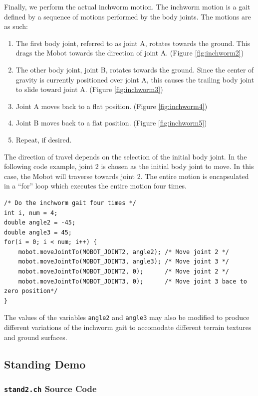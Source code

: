 \documentclass{article}
\begin{document}
Finally, we perform the actual inchworm motion. The inchworm motion is a gait defined
by a sequence of motions performed by the body joints. The motions are as such:
\begin{enumerate}
\item The first body joint, referred to as joint A, rotates towards the ground.
This drags the Mobot towards the direction of joint A. (Figure \ref{fig:inchworm2})
\item The other body joint, joint B, rotates towards the ground. Since the center
of gravity is currently positioned over joint A, this causes the trailing body 
joint to slide toward joint A. (Figure \ref{fig:inchworm3})
\item Joint A moves back to a flat position. (Figure \ref{fig:inchworm4})
\item Joint B moves back to a flat position. (Figure \ref{fig:inchworm5})
\item Repeat, if desired.
\end{enumerate}
The direction of travel depends on the selection of the initial body joint. In
the following code example, joint 2 is chosen as the initial body joint to move.
In this case, the Mobot will traverse towards joint 2. The entire motion is
encapsulated in a ``for'' loop which executes the entire motion four times.
\begin{verbatim}
/* Do the inchworm gait four times */
int i, num = 4;
double angle2 = -45;
double angle3 = 45;
for(i = 0; i < num; i++) {
    mobot.moveJointTo(MOBOT_JOINT2, angle2); /* Move joint 2 */
    mobot.moveJointTo(MOBOT_JOINT3, angle3); /* Move joint 3 */
    mobot.moveJointTo(MOBOT_JOINT2, 0);      /* Move joint 2 */
    mobot.moveJointTo(MOBOT_JOINT3, 0);      /* Move joint 3 bace to zero position*/
}
\end{verbatim}
The values of the variables \texttt{angle2} and \texttt{angle3} may also be modified
to produce different variations of the inchworm gait to accomodate different terrain
textures and ground surfaces.

\subsection{Standing Demo}
\subsubsection{\texttt{stand2.ch} Source Code}

\end{document}
